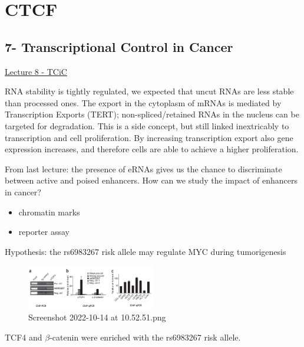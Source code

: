 \graphicspath{{chapters/_resources/}}

\chapter{CTCF}



\hypertarget{transcriptional-control-in-cancer}{%
\section{7- Transcriptional Control in Cancer}\label{transcriptional-control-in-cancer}}

\href{:/debeaed24e9c444e88c9a5ad1e251391}{Lecture 8 - TCiC}

RNA stability is tightly regulated, we expected that uncut RNAs are less stable than processed ones. The export in the cytoplasm of mRNAs is mediated by Transcription Exports (TERT); non-spliced/retained RNAs in the nucleus can be targeted for degradation. This is a side concept, but still linked inextricably to transcription and cell proliferation. By increasing transcription export also gene expression increases, and therefore cells are able to achieve a higher proliferation.

From last lecture: the presence of eRNAs gives us the chance to discriminate between active and poised enhancers. How can we study the impact of enhancers in cancer?

\begin{itemize}
\tightlist
\item
  chromatin marks
\item
  reporter assay
\end{itemize}

Hypothesis: the rs6983267 risk allele may regulate MYC during tumorigenesis

\begin{figure}
\centering
\includegraphics[width=0.5\textwidth]{../_resources/Screenshot_2022-10-14_at_10-52-51.png}
\caption{Screenshot 2022-10-14 at 10.52.51.png}
\end{figure}

TCF4 and $\beta$-catenin were enriched with the rs6983267 risk allele.

